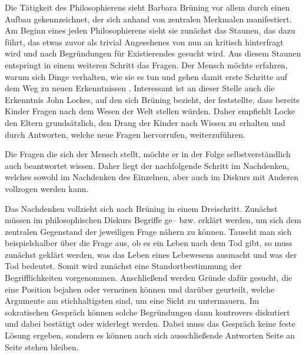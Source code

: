 Die Tätigkeit des Philosophierens sieht Barbara Brüning vor allem durch einen Aufbau gekennzeichnet, der sich anhand von zentralen Merkmalen manifestiert. 
Am Beginn eines jeden Philosophierens sieht sie zunächst das Staunen, das dazu führt, das etwas zuvor als trivial Angesehenes von nun an kritisch hinterfragt wird und nach Begründungen für Existierendes gesucht wird. 
Aus diesem Staunen entspringt in einem weiteren Schritt das Fragen. 
Der Mensch möchte erfahren, warum sich Dinge verhalten, wie sie es tun und gehen damit \glqq erste Schritte auf dem Weg zu neuen Erkenntnissen\grqq{} \cite[S.\,10]{BB10}. 
Interessant ist an dieser Stelle auch die Erkenntnis John Lockes, auf den sich Brüning bezieht, der feststellte, dass bereits Kinder Fragen nach dem Wesen der Welt stellen würden. 
Daher empfiehlt Locke den Eltern grundsätzlich, den Drang der Kinder nach Wissen zu erhalten und durch Antworten, welche neue Fragen hervorrufen, weiterzuführen.

Die Fragen die sich der Mensch stellt, möchte er in der Folge selbstverständlich auch beantwortet wissen. 
Daher liegt der nachfolgende Schritt im Nachdenken, welches sowohl im Nachdenken des Einzelnen, aber auch im Diskurs mit Anderen vollzogen werden kann. 

Das Nachdenken vollzieht sich nach Brüning in einem Dreischritt. 
Zunächst müssen im philosophischen Diskurs Begriffe ge-- bzw. erklärt werden, um sich dem zentralen Gegenstand der jeweiligen Frage nähern zu können. 
Tauscht man sich beispielshalber über die Frage aus, ob es ein Leben nach dem Tod gibt, so muss zunächst geklärt werden, was das Leben eines Lebewesens ausmacht und was der Tod bedeutet. 
Somit wird zunächst eine Standortbestimmung der Begrifflichkeiten vorgenommen. 
Anschließend werden Gründe dafür gesucht, die eine Position bejahen oder verneinen können und darüber geurteilt, welche Argumente am stichhaltigsten sind, um eine Sicht zu untermauern. 
Im sokratischen Gespräch können solche Begründungen dann kontrovers diskutiert und dabei bestätigt oder widerlegt werden. 
Dabei muss das Gespräch keine feste Lösung ergeben, sondern es können auch sich ausschließende Antworten Seite an Seite stehen bleiben\cite[S.\,11]{BB10}.

